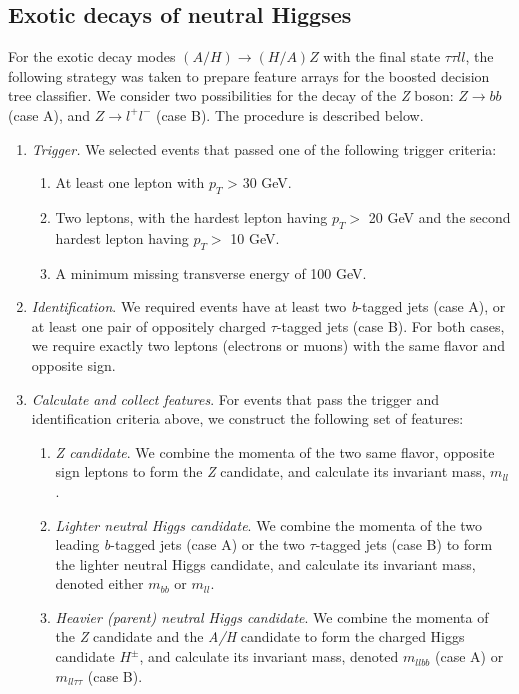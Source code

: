 {\subsection{Exotic decays of neutral Higgses}\label{subsec:A_HZ_analysis}
For the exotic decay modes $(A/H)\rightarrow(H/A)Z$ with the final state $\tau\tau ll$, the following strategy was taken to prepare feature arrays for the boosted decision tree classifier. We consider two possibilities for the decay of the \emph{Z} boson: $Z\rightarrow bb$ (case A), and $Z\rightarrow l^+l^-$ (case B). The procedure is described below.
\begin{enumerate}
  \item \emph{Trigger.} We selected events that passed one of the following trigger criteria:
    \begin{enumerate}
      \item At least one lepton with $p_T$ > 30 GeV.
      \item Two leptons, with the hardest lepton having $p_T > $ 20 GeV and the second hardest lepton having $p_T > $ 10 GeV.
      \item A minimum missing transverse energy of 100 GeV.
    \end{enumerate}
  \item \emph{Identification}. We required events have at least two \emph{b}-tagged jets (case A), or at least one pair of oppositely charged $\tau$-tagged jets (case B). For both cases, we require exactly two leptons (electrons or muons) with the same flavor and opposite sign.
  \item\emph{Calculate and collect features}. For events that pass the trigger and identification criteria above, we construct the following set of features:
    \begin{enumerate}
      \item {\itshape \emph{Z} candidate}. We combine the momenta of the two same flavor, opposite sign leptons to form the \emph{Z} candidate, and calculate its invariant mass,  $m_{ll}$.
      \item {\itshape Lighter neutral Higgs candidate}. We combine the momenta of the two leading \emph{b}-tagged jets (case A) or the two $\tau$-tagged jets (case B) to form the lighter neutral Higgs candidate, and calculate its invariant mass, denoted either $m_{bb}$ or $m_{ll}$.
      \item {\itshape Heavier (parent) neutral Higgs candidate}. We combine the momenta of the \emph{Z} candidate and the \emph{A/H} candidate to form the charged Higgs candidate $H^\pm$, and calculate its invariant mass, denoted $m_{llbb}$ (case A) or $m_{ll\tau\tau}$ (case B).

\end{enumerate}
\end{enumerate}}

